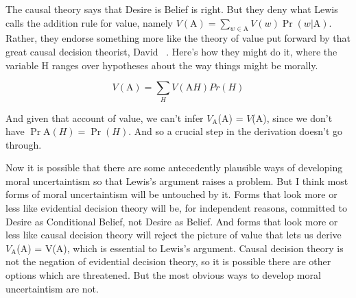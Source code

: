 The causal theory says that Desire is Belief is right. But they deny what Lewis calls the addition rule for value, namely $V(\text{A}) = \sum_{w \in \text{A}} V(w) \Pr(w | \text{A})$. Rather, they endorse something more like the theory of value put forward by that great causal decision theorist, David ~\citep{Lewis1981x}. Here's how they might do it, where the variable H ranges over hypotheses about the way things might be morally.

$$V(\text{A}) = \sum_{H} V(\text{A}H) Pr(H)$$

And given that account of value, we can't infer $V_\text{A}$(A) = $V$(A), since we don't have $\Pr\text{A}(H) = \Pr(H)$. And so a crucial step in the derivation doesn't go through.

Now it is possible that there are some antecedently plausible ways of developing moral uncertaintism so that Lewis's argument raises a problem. But I think most forms of moral uncertaintism will be untouched by it. Forms that look more or less like evidential decision theory will be, for independent reasons, committed to Desire as Conditional Belief, not Desire as Belief. And forms that look more or less like causal decision theory will reject the picture of value that lets us derive $V_\text{A}$(A) = V(A), which is essential to Lewis's argument. Causal decision theory is not the negation of evidential decision theory, so it is possible there are other options which are threatened. But the most obvious ways to develop moral uncertaintism are not.




